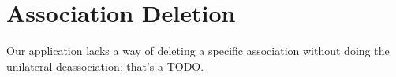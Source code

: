 \section{Association Deletion}
Our application lacks a way of deleting a specific association without doing the unilateral deassociation: that's a TODO.